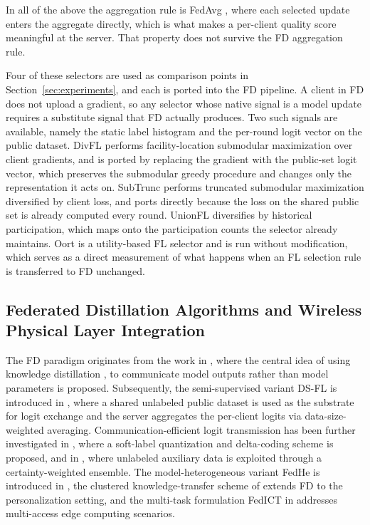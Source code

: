 \documentclass[journal]{IEEEtran}
\newcommand{\rev}[1]{#1}
\begin{document}
In all of the above the aggregation rule is FedAvg \cite{mcmahan2017communication}, where each selected update enters the aggregate directly, which is what makes a per-client quality score meaningful at the server. That property does not survive the FD aggregation rule.

\rev{Four of these selectors are used as comparison points in Section~\ref{sec:experiments}, and each is ported into the FD pipeline. A client in FD does not upload a gradient, so any selector whose native signal is a model update requires a substitute signal that FD actually produces. Two such signals are available, namely the static label histogram and the per-round logit vector on the public dataset. DivFL \cite{balakrishnan2022divfl} performs facility-location submodular maximization over client gradients, and is ported by replacing the gradient with the public-set logit vector, which preserves the submodular greedy procedure and changes only the representation it acts on. SubTrunc \cite{castillo2024subtrunc} performs truncated submodular maximization diversified by client loss, and ports directly because the loss on the shared public set is already computed every round. UnionFL \cite{castillo2025subtrunc} diversifies by historical participation, which maps onto the participation counts the selector already maintains. Oort \cite{lai2021oort} is a utility-based FL selector and is run without modification, which serves as a direct measurement of what happens when an FL selection rule is transferred to FD unchanged.}

\subsection{Federated Distillation Algorithms and Wireless Physical Layer Integration}
\label{ssec:rw-fd}

The FD paradigm originates from the work in \cite{jeong2018communication}, where the central idea of using knowledge distillation \cite{hinton2015distilling}, \cite{wang2022kd} to communicate model outputs rather than model parameters is proposed. Subsequently, the semi-supervised variant DS-FL is introduced in \cite{itahara2023distillation}, where a shared unlabeled public dataset is used as the substrate for logit exchange and the server aggregates the per-client logits via data-size-weighted averaging. Communication-efficient logit transmission has been further investigated in \cite{sattler2022cfd}, where a soft-label quantization and delta-coding scheme is proposed, and in \cite{sattler2023fedaux}, where unlabeled auxiliary data is exploited through a certainty-weighted ensemble. The model-heterogeneous variant FedHe is introduced in \cite{chan2021fedhe}, the clustered knowledge-transfer scheme of \cite{cho2023clustered} extends FD to the personalization setting, and the multi-task formulation FedICT in \cite{wu2024fedict} addresses multi-access edge computing scenarios.
\end{document}
